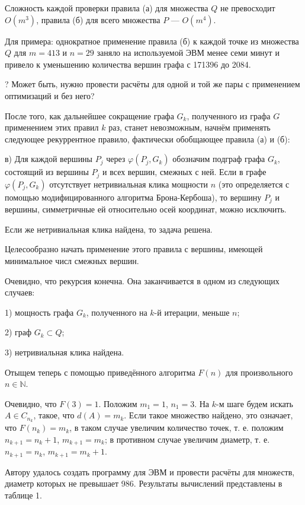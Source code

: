 \documentclass{article}
\begin{document}
Сложность каждой проверки правила (а) для множества $Q$ не превосходит $O(m^3)$, правила (б) для всего множества $P$ --- $O(m^4)$.

Для примера: однократное применение правила (б) к каждой точке из множества $Q$ для $m=413$ и $n=29$ заняло на используемой ЭВМ менее семи минут и привело к уменьшению количества вершин графа с 171396 до 2084.

? Может быть, нужно провести расчёты для одной и той же пары с применением оптимизаций и без него?

После того, как дальнейшее сокращение графа $G_k$, полученного из графа $G$ применением этих правил $k$ раз, станет невозможным, начнём применять следующее рекуррентное правило, фактически обобщающее правила (а) и (б):

в)
Для каждой вершины $P_j$ через $\varphi(P_j,G_k)$ обозначим подграф графа $G_k$, состоящий из вершины $P_j$ и всех вершин, смежных с ней.
Если в графе $\varphi(P_j,G_k)$ отсутствует нетривиальная клика мощности $n$ (это определяется с помощью модифицированного алгоритма Брона-Кербоша), то вершину $P_j$ и вершины, симметричные ей относительно осей координат, можно исключить.

Если же нетривиальная клика найдена, то задача решена.

Целесообразно начать применение этого правила с вершины, имеющей минимальное числ смежных вершин.

Очевидно, что рекурсия конечна.
Она заканчивается в одном из следующих случаев:

1) мощность графа $G_k$, полученного на $k$-й итерации, меньше $n$;

2) граф $G_k \subset Q$;

3) нетривиальная клика найдена.



Отыщем теперь с помощью приведённого алгоритма $F(n)$ для произвольного $n \in \mathbb{N}$.

Очевидно, что $F(3) = 1$.
Положим $m_1=1$, $n_1=3$.
На $k$-м шаге будем искать $A \in C_{n_k}$, такое, что $d(A) = m_k$.
Если такое множество найдено, это означает, что $F(n_k)=m_k$,
в таком случае увеличим количество точек, т. е. положим $n_{k+1} = n_k +1$, $m_{k+1} = m_k$;
в противном случае увеличим диаметр, т. е. $n_{k+1} = n_k$, $m_{k+1} = m_k +1$.



Автору удалось создать программу для ЭВМ и провести расчёты для множеств, диаметр которых не превышает 986.
Результаты вычислений представлены в таблице 1.
\end{document}
